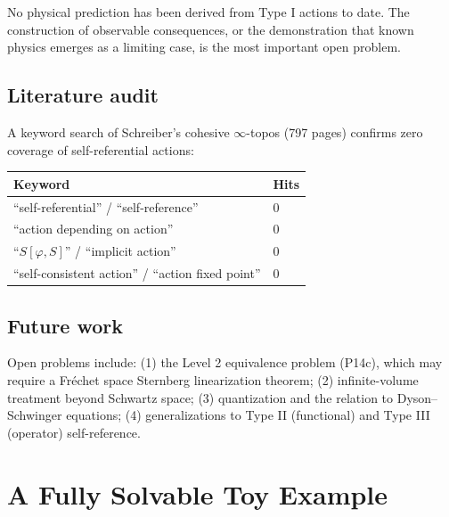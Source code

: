 \documentclass[12pt,letterpaper]{article}
\theoremstyle{definition}
\begin{document}
No physical prediction has been derived from Type I actions to date. The construction of observable consequences, or the demonstration that known physics emerges as a limiting case, is the most important open problem.

\subsection{Literature audit}
\label{sec:lit-audit}

A keyword search of Schreiber's cohesive $\infty$-topos \cite{Schreiber2013} (797 pages) confirms zero coverage of self-referential actions:

\begin{center}
\begin{tabular}{ll}
\toprule
Keyword & Hits \\
\midrule
``self-referential'' / ``self-reference'' & 0 \\
``action depending on action'' & 0 \\
``$S[\varphi, S]$'' / ``implicit action'' & 0 \\
``self-consistent action'' / ``action fixed point'' & 0 \\
\bottomrule
\end{tabular}
\end{center}

\subsection{Future work}

Open problems include: (1) the Level 2 equivalence problem (P14c), which may require a Fr\'echet space Sternberg linearization theorem; (2) infinite-volume treatment beyond Schwartz space; (3) quantization and the relation to Dyson--Schwinger equations; (4) generalizations to Type II (functional) and Type III (operator) self-reference.

\appendix

\section{A Fully Solvable Toy Example}
\label{sec:toy}
\end{document}
